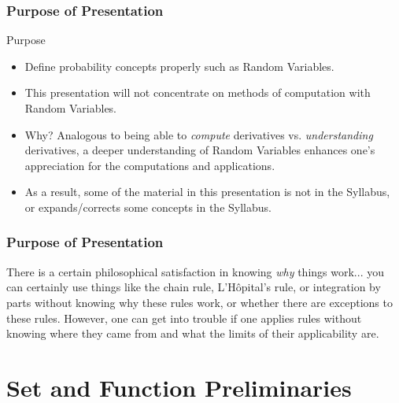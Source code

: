 \documentclass{beamer}
\begin{document}
\begin{frame}
\frametitle{Purpose of Presentation}
\begin{block}{Purpose}
  \begin{itemize}
    \item<2-> Define probability concepts properly such as Random Variables.
    \item<3-> This presentation will not concentrate on methods of computation with Random Variables.
    \item<4-> Why? Analogous to being able to \emph{compute} derivatives vs. \emph{understanding} derivatives, a deeper understanding of Random Variables enhances one's appreciation for the computations and applications.
    \item<5-> As a result, some of the material in this presentation is not in the Syllabus, or expands/corrects some concepts in the Syllabus.
  \end{itemize}
\end{block}
\end{frame}

\begin{frame}
\frametitle{Purpose of Presentation}
\begin{block}{\parencite[pp.~2-3]{analysis_tao}}
  There is a certain philosophical satisfaction in knowing \emph{why} things work... you can certainly use things like the chain rule, L'H\^{o}pital's rule, or integration by parts without knowing why these rules work, or whether there are exceptions to these rules. However, one can get into trouble if one applies rules without knowing where they came from and what the limits of their applicability are.
\end{block}
\end{frame}


\section{Set and Function Preliminaries}

\end{document}
